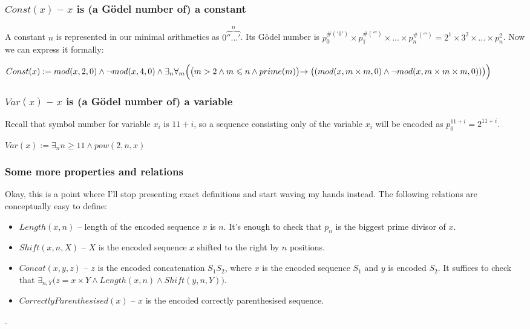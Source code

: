 \documentclass{article}
\begin{document}
\subsubsection{$Const(x)$ -- $x$ is (a Gödel number of) a constant}

A constant $n$ is represented in our minimal arithmetics as $0\overbrace{''...'}^{n}$.
Its Gödel number is $p_0^{\#('0')} \times p_1^{\#(''')} \times ... \times p_n^{\#(''')} =
2^1 \times 3^2 \times ... \times p_n^2$. Now we can express it formally:

\begin{center}
    $Const(x) := mod(x, 2, 0) \land \neg mod(x, 4, 0) \land
    \exists_n \forall_m \Bigl(
        \bigl(
            m > 2 \land m \leqslant n \land prime(m)
        \bigl)
        \rightarrow
        \bigl(
            (mod(x, m \times m, 0) \land \neg mod(x, m \times m \times m, 0))
        \bigl)
    \Bigl)$
\end{center}

\subsubsection{$Var(x)$ -- $x$ is (a Gödel number of) a variable}

Recall that symbol number for variable $x_i$ is $11 + i$, so a sequence consisting only of
the variable $x_i$ will be encoded as $p_0^{11 + i} = 2^{11 + i}$.

\begin{center}
    $Var(x) := \exists_n n \geqslant 11 \land pow(2, n, x)$
\end{center}

\subsubsection{Some more properties and relations}

Okay, this is a point where I'll stop presenting exact definitions and start waving my hands
instead. The following relations are conceptually easy to define:

\begin{itemize}
    \item $Length(x, n)$ -- length of the encoded sequence $x$ is $n$. It's enough to check that
        $p_n$ is the biggest prime divisor of $x$.
    \item $Shift(x, n, X)$ -- $X$ is the encoded sequence $x$ shifted to the right by $n$ positions.
    \item $Concat(x, y, z)$ -- $z$ is the encoded concatenation $S_1S_2$, where $x$ is the
        encoded sequence $S_1$ and $y$ is encoded $S_2$. It suffices to check that
        $\exists_{n, Y} \bigl( z = x \times Y \land Length(x, n) \land Shift(y, n, Y) \bigl)$.
    \item $CorrectlyParenthesised(x)$ -- $x$ is the encoded correctly parenthesised sequence.
\end{itemize}.
\end{document}
